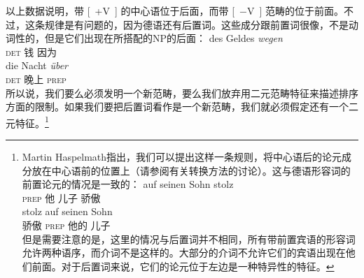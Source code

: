 \zl
以上数据说明，带 [~+V~] 的中心语位于后面，而带 [~$-$V~] 范畴的位于前面。不过，这条规律是有问题的，因为德语还有后置词。这些成分跟前置词很像，不是动词性的，但是它们出现在所搭配的NP的后面：
\eal
\ex 
\gll des Geldes \emph{wegen}\\
     \textsc{det} 钱 因为\\
\ex 
\gll die Nacht \emph{über}\\
     \textsc{det} 晚上 \textsc{prep}\\
\zl
所以说，我们要么必须发明一个新范畴，要么我们放弃用二元范畴特征来描述排序方面的限制。如果我们要把后置词看作是一个新范畴，我们就必须假定还有一个二元特征。\footnote{%
Martin Haspelmath指出，我们可以提出这样一条规则，将中心语后的论元成分放在中心语前的位置上（请参阅\citealp[]{Riemsdijk78a}有关转换方法的讨论）。这与德语形容词的前置论元的情况是一致的：
\eal
\ex
\gll auf seinen Sohn stolz\\
     \textsc{prep}  他 儿子 骄傲\\
\ex 
\gll stolz auf seinen Sohn\\
     骄傲 \textsc{prep} 他的 儿子\\
\zl
但是需要注意的是，这里的情况与后置词并不相同，所有带前置宾语的形容词允许两种语序，而介词不是这样的。大部分的介词不允许它们的宾语出现在他们前面。对于后置词来说，它们的论元位于左边是一种特异性的特征。
} 
